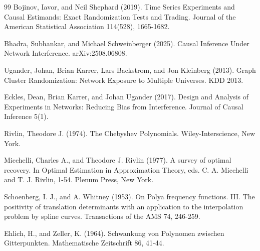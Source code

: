 \documentclass{article}
\begin{document}
\begin{thebibliography}{99}
   Bojinov, Iavor, and Neil Shephard (2019). Time Series Experiments and Causal Estimands: Exact Randomization Tests and Trading. Journal of the American Statistical Association 114(528), 1665-1682.

   Bhadra, Subhankar, and Michael Schweinberger (2025). Causal Inference Under Network Interference. arXiv:2508.06808.

   Ugander, Johan, Brian Karrer, Lars Backstrom, and Jon Kleinberg (2013). Graph Cluster Randomization: Network Exposure to Multiple Universes. KDD 2013.

   Eckles, Dean, Brian Karrer, and Johan Ugander (2017). Design and Analysis of Experiments in Networks: Reducing Bias from Interference. Journal of Causal Inference 5(1).

   Rivlin, Theodore J. (1974). The Chebyshev Polynomials. Wiley-Interscience, New York.

   Micchelli, Charles A., and Theodore J. Rivlin (1977). A survey of optimal recovery. In Optimal Estimation in Approximation Theory, eds. C. A. Micchelli and T. J. Rivlin, 1-54. Plenum Press, New York.

   Schoenberg, I. J., and A. Whitney (1953). On Polya frequency functions. III. The positivity of translation determinants with an application to the interpolation problem by spline curves. Transactions of the AMS 74, 246-259.

   Ehlich, H., and Zeller, K. (1964). Schwankung von Polynomen zwischen Gitterpunkten. Mathematische Zeitschrift 86, 41-44.

\end{thebibliography}
\end{document}

